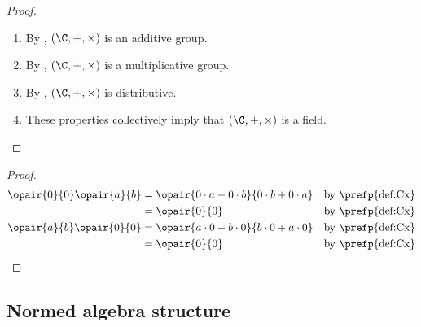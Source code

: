 \begin{theorem}
\end{theorem}
\begin{proof}
\begin{enumerate}
  \item By , $(\C,+,\times)$ is an additive group.
  \item By , $(\C,+,\times)$ is a multiplicative group.
  \item By , $(\C,+,\times)$ is distributive.
  \item These properties collectively imply that $(\C,+,\times)$ is a field.
\end{enumerate}
\end{proof}

\begin{proposition}
\end{proposition}
\begin{proof}
\begin{align*}
  \opair{0}{0}\opair{a}{b}
    &= \opair{0 \cdot a-0\cdot b}{0\cdot b + 0\cdot a}
    && \text{by \prefp{def:Cx}}
  \\&= \opair{0 }{0}
    && \text{by \prefp{def:Cx}}
  \\
  \opair{a}{b} \opair{0}{0}
    &= \opair{a \cdot 0-b\cdot 0}{b\cdot 0 + a\cdot 0}
    && \text{by \prefp{def:Cx}}
  \\&= \opair{0 }{0}
    && \text{by \prefp{def:Cx}}
\end{align*}
\end{proof}

\subsection{Normed algebra structure}
\begin{definition}
\label{def:C_abs}
\indxs{\absn\in\clF{\C}{\R}}
\end{definition}



